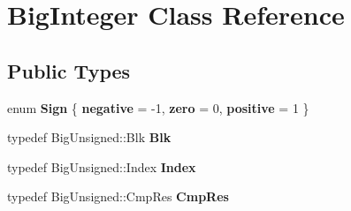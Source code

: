 \hypertarget{class_big_integer}{}\section{Big\+Integer Class Reference}
\label{class_big_integer}
\subsection*{Public Types}
\begin{DoxyCompactItemize}
\item 
\mbox{\label{class_big_integer_ab8bd05c604c2549930bd6f9169c13212}} 
enum {\bfseries Sign} \{ {\bfseries negative} = -\/1, 
{\bfseries zero} = 0, 
{\bfseries positive} = 1
 \}
\item 
\mbox{\label{class_big_integer_a087f32e1a98d13063afabbbba5ee7777}} 
typedef Big\+Unsigned\+::\+Blk {\bfseries Blk}
\item 
\mbox{\label{class_big_integer_a9211ee1ab111812c13a85946850abed4}} 
typedef Big\+Unsigned\+::\+Index {\bfseries Index}
\item 
\mbox{\label{class_big_integer_abf5f4fc1341fa57ab2247204f75107d0}} 
typedef Big\+Unsigned\+::\+Cmp\+Res {\bfseries Cmp\+Res}
\end{DoxyCompactItemize}
